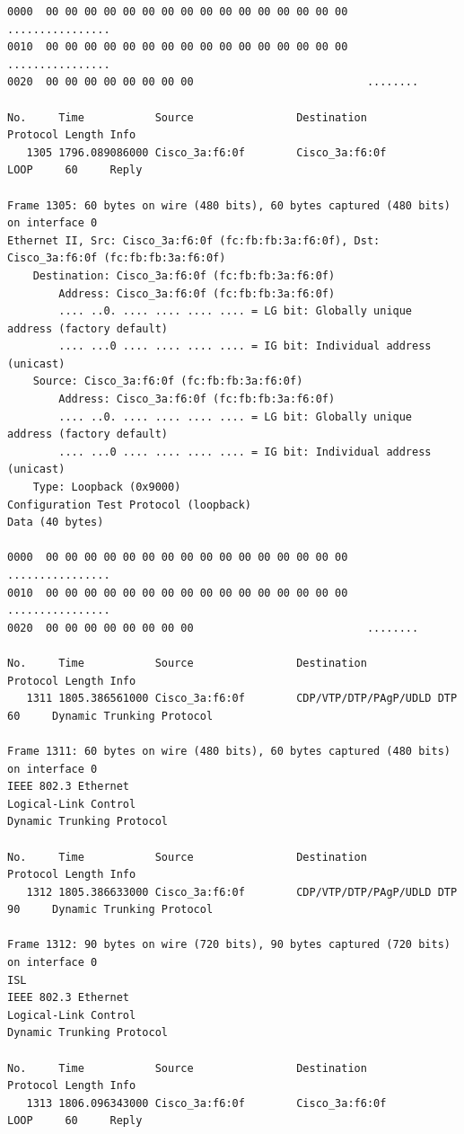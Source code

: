 \documentclass[a4paper,11pt]{article}
\begin{document}
\begin{lstlisting}
0000  00 00 00 00 00 00 00 00 00 00 00 00 00 00 00 00   ................
0010  00 00 00 00 00 00 00 00 00 00 00 00 00 00 00 00   ................
0020  00 00 00 00 00 00 00 00                           ........

No.     Time           Source                Destination           Protocol Length Info
   1305 1796.089086000 Cisco_3a:f6:0f        Cisco_3a:f6:0f        LOOP     60     Reply

Frame 1305: 60 bytes on wire (480 bits), 60 bytes captured (480 bits) on interface 0
Ethernet II, Src: Cisco_3a:f6:0f (fc:fb:fb:3a:f6:0f), Dst: Cisco_3a:f6:0f (fc:fb:fb:3a:f6:0f)
    Destination: Cisco_3a:f6:0f (fc:fb:fb:3a:f6:0f)
        Address: Cisco_3a:f6:0f (fc:fb:fb:3a:f6:0f)
        .... ..0. .... .... .... .... = LG bit: Globally unique address (factory default)
        .... ...0 .... .... .... .... = IG bit: Individual address (unicast)
    Source: Cisco_3a:f6:0f (fc:fb:fb:3a:f6:0f)
        Address: Cisco_3a:f6:0f (fc:fb:fb:3a:f6:0f)
        .... ..0. .... .... .... .... = LG bit: Globally unique address (factory default)
        .... ...0 .... .... .... .... = IG bit: Individual address (unicast)
    Type: Loopback (0x9000)
Configuration Test Protocol (loopback)
Data (40 bytes)

0000  00 00 00 00 00 00 00 00 00 00 00 00 00 00 00 00   ................
0010  00 00 00 00 00 00 00 00 00 00 00 00 00 00 00 00   ................
0020  00 00 00 00 00 00 00 00                           ........

No.     Time           Source                Destination           Protocol Length Info
   1311 1805.386561000 Cisco_3a:f6:0f        CDP/VTP/DTP/PAgP/UDLD DTP      60     Dynamic Trunking Protocol

Frame 1311: 60 bytes on wire (480 bits), 60 bytes captured (480 bits) on interface 0
IEEE 802.3 Ethernet 
Logical-Link Control
Dynamic Trunking Protocol

No.     Time           Source                Destination           Protocol Length Info
   1312 1805.386633000 Cisco_3a:f6:0f        CDP/VTP/DTP/PAgP/UDLD DTP      90     Dynamic Trunking Protocol

Frame 1312: 90 bytes on wire (720 bits), 90 bytes captured (720 bits) on interface 0
ISL
IEEE 802.3 Ethernet 
Logical-Link Control
Dynamic Trunking Protocol

No.     Time           Source                Destination           Protocol Length Info
   1313 1806.096343000 Cisco_3a:f6:0f        Cisco_3a:f6:0f        LOOP     60     Reply


\end{lstlisting}
\end{document}
